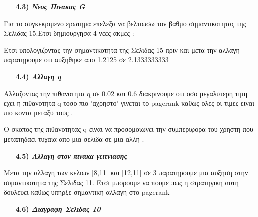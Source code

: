 \documentclass[a4paper,11pt]{article}
\begin{document}
	\begin{enumerate}
		\item[\textbf{4.3)}] \emph {\textbf{Νεος Πινακας G}}
	\end{enumerate}
	\begin{center}
		Για το συγκεκριμενο ερωτημα επελεξα να βελτιωσω τον βαθμο σημαντικοτητας της Σελιδας 15.Ετσι δημιουργησα 4 νεες ακμες :
		\begin{enumerate}
			\item[\text{(1)}] {}
			\item[\text{(2)}] {}
			\item[\text{(3)}] {}
			\item[\text{(4)}] {}
		\end{enumerate}
		Ετσι υπολογιζοντας την σημαντικοτητα της Σελιδας 15 πριν και μετα την αλλαγη παρατηρουμε οτι αυξηθηκε απο 1.2125 σε 2.1333333333
	\end{center}
		\begin{enumerate}
		\item[\textbf{4.4)}] \emph {\textbf{Αλλαγη q}}
	\end{enumerate}
	\begin{center}
		Αλλαζοντας την πιθανοτητα q σε 0.02 και 0.6 διακρινουμε οτι οσο μεγαλυτερη τιμη εχει η πιθανοτητα q τοσο πιο 'αχρηστο' γινεται το pagerank καθως ολες οι τιμες ειναι πιο κοντα μεταξυ τους .
	\end{center}
	\begin{center}
		Ο σκοπος της πιθανοτητας q ειναι να προσομοιωνει την συμπεριφορα του χρηστη που μεταπηδαει τυχαια απο μια σελιδα σε μια αλλη .
	\end{center}
	
	\begin{enumerate}
		\item[\textbf{4.5)}] \emph {\textbf{Αλλαγη στον πινακα γειτνιασης}}
	\end{enumerate}
	\begin{center}
			Μετα την αλλαγη των κελιων [8,11] και [12,11] σε 3 παρατηρουμε μια αυξηση στην συμαντικοτητα της Σελιδας 11. Ετσι μπορουμε να πουμε πως η στρατηγικη αυτη δουλευει καθως υπηρξε σημαντικη αλλαγη στο pagerank
	\end{center}
	\begin{enumerate}
		\item[\textbf{4.6)}] \emph {\textbf{Διαγραφη Σελιδας 10}}
	\end{enumerate}
	
\end{document}
